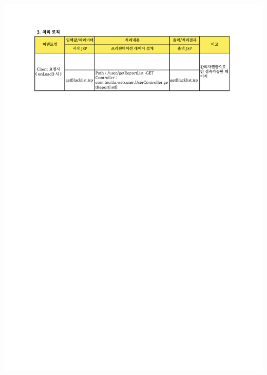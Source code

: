 {{{{{{{{{{{{{{{{\includegraphics[width=20cm]{./Figure/Design/Display/user/user_16.pdf} \\
}}}}}}}}}}}}}}}}
